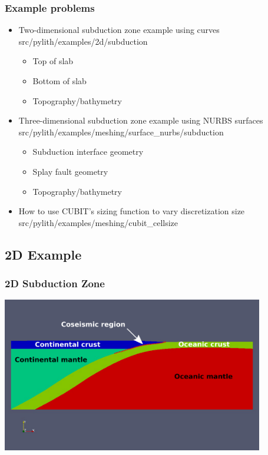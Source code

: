 \documentclass{beamer}
\newcommand{\important}[1]{{\color{red}#1}}
\begin{document}
\begin{frame}
  \frametitle{Example problems}
  
  \begin{itemize}
  \item Two-dimensional subduction zone example using curves
    \important{src/pylith/examples/2d/subduction}
    \begin{itemize}
    \item Top of slab
    \item Bottom of slab
    \item Topography/bathymetry
    \end{itemize}
  \item Three-dimensional subduction zone example using NURBS surfaces
    \important{src/pylith/examples/meshing/surface\_nurbs/subduction}
    \begin{itemize}
    \item Subduction interface geometry
    \item Splay fault geometry
    \item Topography/bathymetry
    \end{itemize}
  \item How to use CUBIT's sizing function to vary discretization size
    \important{src/pylith/examples/meshing/cubit\_cellsize}
  \end{itemize}

\end{frame}


\subsection{2D Example}

\begin{frame}
  \frametitle{2D Subduction Zone}
 
  \vfill
  \begin{center}
    \includegraphics[width=4.5in]{figs/subduction2d_mesh}
  \end{center}
  \vfill

\end{frame}
\end{document}
